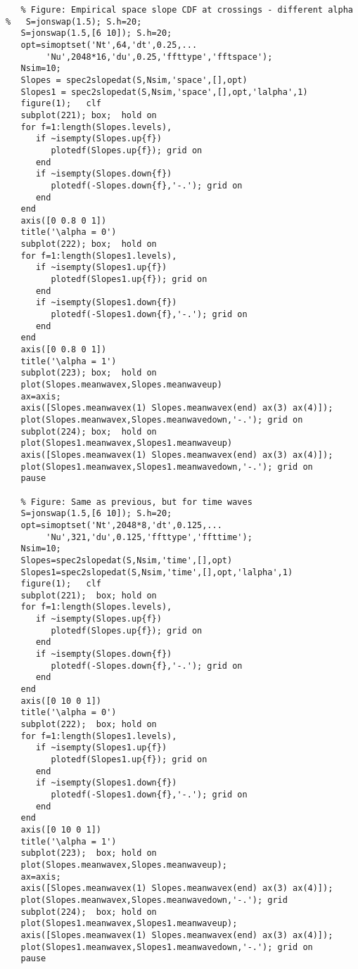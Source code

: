 {\begin{verbatim}
   % Figure: Empirical space slope CDF at crossings - different alpha
%   S=jonswap(1.5); S.h=20;
   S=jonswap(1.5,[6 10]); S.h=20;
   opt=simoptset('Nt',64,'dt',0.25,...
        'Nu',2048*16,'du',0.25,'ffttype','fftspace');
   Nsim=10;
   Slopes = spec2slopedat(S,Nsim,'space',[],opt)
   Slopes1 = spec2slopedat(S,Nsim,'space',[],opt,'lalpha',1)
   figure(1);   clf
   subplot(221); box;  hold on
   for f=1:length(Slopes.levels),
      if ~isempty(Slopes.up{f}) 
         plotedf(Slopes.up{f}); grid on
      end
      if ~isempty(Slopes.down{f}) 
         plotedf(-Slopes.down{f},'-.'); grid on
      end
   end
   axis([0 0.8 0 1])
   title('\alpha = 0')
   subplot(222); box;  hold on
   for f=1:length(Slopes1.levels),
      if ~isempty(Slopes1.up{f}) 
         plotedf(Slopes1.up{f}); grid on
      end
      if ~isempty(Slopes1.down{f}) 
         plotedf(-Slopes1.down{f},'-.'); grid on
      end
   end
   axis([0 0.8 0 1])
   title('\alpha = 1')
   subplot(223); box;  hold on
   plot(Slopes.meanwavex,Slopes.meanwaveup)
   ax=axis;
   axis([Slopes.meanwavex(1) Slopes.meanwavex(end) ax(3) ax(4)]);
   plot(Slopes.meanwavex,Slopes.meanwavedown,'-.'); grid on 
   subplot(224); box;  hold on
   plot(Slopes1.meanwavex,Slopes1.meanwaveup)
   axis([Slopes.meanwavex(1) Slopes.meanwavex(end) ax(3) ax(4)]);
   plot(Slopes1.meanwavex,Slopes1.meanwavedown,'-.'); grid on
   pause
   
   % Figure: Same as previous, but for time waves
   S=jonswap(1.5,[6 10]); S.h=20;
   opt=simoptset('Nt',2048*8,'dt',0.125,...
        'Nu',321,'du',0.125,'ffttype','ffttime');
   Nsim=10;
   Slopes=spec2slopedat(S,Nsim,'time',[],opt)
   Slopes1=spec2slopedat(S,Nsim,'time',[],opt,'lalpha',1)
   figure(1);   clf
   subplot(221);  box; hold on
   for f=1:length(Slopes.levels),
      if ~isempty(Slopes.up{f}) 
         plotedf(Slopes.up{f}); grid on
      end
      if ~isempty(Slopes.down{f}) 
         plotedf(-Slopes.down{f},'-.'); grid on 
      end
   end
   axis([0 10 0 1])
   title('\alpha = 0')
   subplot(222);  box; hold on
   for f=1:length(Slopes1.levels),
      if ~isempty(Slopes1.up{f}) 
         plotedf(Slopes1.up{f}); grid on
      end
      if ~isempty(Slopes1.down{f}) 
         plotedf(-Slopes1.down{f},'-.'); grid on 
      end
   end
   axis([0 10 0 1])
   title('\alpha = 1')
   subplot(223);  box; hold on
   plot(Slopes.meanwavex,Slopes.meanwaveup); 
   ax=axis;
   axis([Slopes.meanwavex(1) Slopes.meanwavex(end) ax(3) ax(4)]);
   plot(Slopes.meanwavex,Slopes.meanwavedown,'-.'); grid
   subplot(224);  box; hold on
   plot(Slopes1.meanwavex,Slopes1.meanwaveup);
   axis([Slopes.meanwavex(1) Slopes.meanwavex(end) ax(3) ax(4)]);
   plot(Slopes1.meanwavex,Slopes1.meanwavedown,'-.'); grid on
   pause
   

\end{verbatim}}

